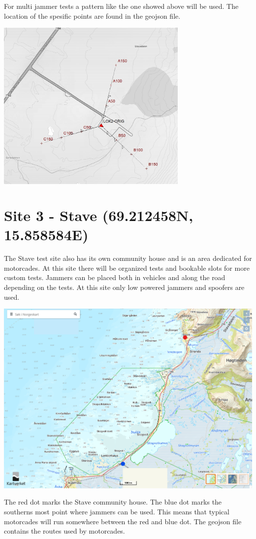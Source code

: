 For multi jammer tests a pattern like the one showed above will be used. The location of the spesific points are found in the geojson file.\\

\begin{center}
\includegraphics[width = 0.7\textwidth]{site_2_pattern.jpeg}\\
\end{center}

\section{Site 3 - Stave (69.212458N, 15.858584E)}
The Stave test site also has its own community house and is an area dedicated for motorcades. At this site there will be organized tests and bookable slots for more custom tests. Jammers can be placed both in vehicles and along the road depending on the tests. At this site only low powered jammers and spoofers are used. \\


\begin{center}
\includegraphics[width = \textwidth]{stave.png}\\ 
\end{center}

The red dot marks the Stave community house. The blue dot marks the southerns most point where jammers can be used. This means that typical motorcades will run somewhere between the red and blue dot. The geojson file contains the routes used by motorcades.